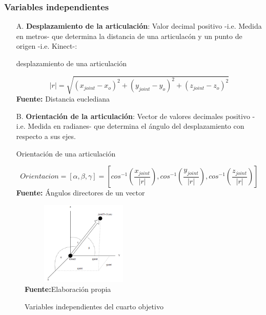\subsubsection{Variables independientes} \label{vr:4o:indep}
\begin{enumerate}
	\item[A.] \textbf{Desplazamiento de la articulaci\'on}: Valor decimal positivo -i.e. Medida en metros- que determina la distancia de una articulac\'on y un punto de origen -i.e. Kinect-:
\begin{formula}[h]
	\centering
	\caption{desplazamiento de una articulaci\'on}
	\label{frm:alturaUser}
	\begin{equation}
|r|=\sqrt{(x_{joint}-x_{o})^{2}+(y_{joint}-y_{o})^{2}+(z_{joint}-z_{o})^{2}}
	\end{equation}
	\textbf{Fuente:} Distancia euclediana \cite[p.~423]{ayres2001calculo}
\end{formula}  
	\item[B.] \textbf{Orientaci\'on de la articulaci\'on}: Vector de valores decimales positivo -i.e. Medida en radianes- que determina el \'angulo del desplazamiento con respecto a sus ejes.
\begin{formula}[h]
	\centering
	\caption{Orientaci\'on de una articulaci\'on}
	\label{frm:alturaUser}
	\begin{equation}
Orientacion = [\alpha ,\beta ,\gamma ] = [cos^{-1}(\frac{x_{joint}}{|r|}),cos^{-1}(\frac{y_{joint}}{|r|}),cos^{-1}(\frac{z_{joint}}{|r|})]
	\end{equation}
	\textbf{Fuente:} \'Angulos directores de un vector \cite[p.~424]{ayres2001calculo}
\end{formula}  
\end{enumerate}
\medbreak
\begin{figure}[H]
	\caption{Variables independientes del cuarto objetivo}
	\label{fig:varIdep4}
	\centering
	\includegraphics[width=230px,height=150px]{graphics/var-4obj-ind.png} \\
	\textbf{Fuente:}Elaboraci\'on propia 
\end{figure}
